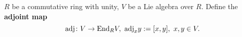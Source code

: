 \begin{definition}
  $R$ be a commutative ring with unity, $V$ be a Lie algebra over $R$.
  Define the \textbf{adjoint map}
  \begin{equation}
    {\rm adj} \colon V \to {\rm End}_R V,\
    {\rm adj}_x y := [x, y],\ x, y \in V.
  \end{equation}
\end{definition}
